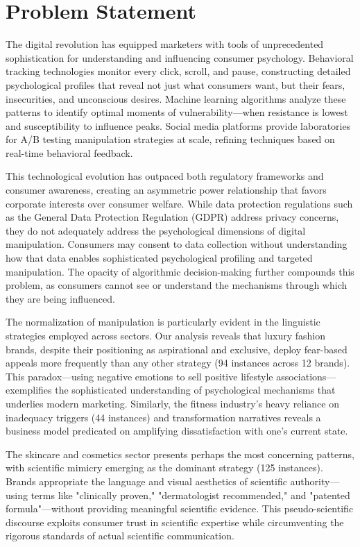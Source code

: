 \section{Problem Statement}
\label{sec:problem_statement}

The digital revolution has equipped marketers with tools of unprecedented sophistication for understanding and influencing consumer psychology. Behavioral tracking technologies monitor every click, scroll, and pause, constructing detailed psychological profiles that reveal not just what consumers want, but their fears, insecurities, and unconscious desires. Machine learning algorithms analyze these patterns to identify optimal moments of vulnerability—when resistance is lowest and susceptibility to influence peaks. Social media platforms provide laboratories for A/B testing manipulation strategies at scale, refining techniques based on real-time behavioral feedback.

This technological evolution has outpaced both regulatory frameworks and consumer awareness, creating an asymmetric power relationship that favors corporate interests over consumer welfare. While data protection regulations such as the General Data Protection Regulation (GDPR) address privacy concerns, they do not adequately address the psychological dimensions of digital manipulation. Consumers may consent to data collection without understanding how that data enables sophisticated psychological profiling and targeted manipulation. The opacity of algorithmic decision-making further compounds this problem, as consumers cannot see or understand the mechanisms through which they are being influenced.

The normalization of manipulation is particularly evident in the linguistic strategies employed across sectors. Our analysis reveals that luxury fashion brands, despite their positioning as aspirational and exclusive, deploy fear-based appeals more frequently than any other strategy (94 instances across 12 brands). This paradox—using negative emotions to sell positive lifestyle associations—exemplifies the sophisticated understanding of psychological mechanisms that underlies modern marketing. Similarly, the fitness industry's heavy reliance on inadequacy triggers (44 instances) and transformation narratives reveals a business model predicated on amplifying dissatisfaction with one's current state.

The skincare and cosmetics sector presents perhaps the most concerning patterns, with scientific mimicry emerging as the dominant strategy (125 instances). Brands appropriate the language and visual aesthetics of scientific authority—using terms like "clinically proven," "dermatologist recommended," and "patented formula"—without providing meaningful scientific evidence. This pseudo-scientific discourse exploits consumer trust in scientific expertise while circumventing the rigorous standards of actual scientific communication.

